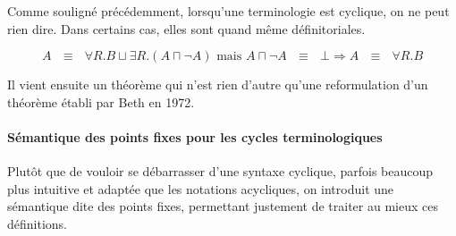 
\par Comme souligné précédemment, lorsqu'une terminologie est cyclique, on ne peut rien dire. Dans certains cas, elles sont quand même définitoriales.

\begin{exemple}
  \begin{displaymath}
    A\mbox{ } \equiv \mbox{ }\forall R.B \sqcup \exists R.(A\sqcap \neg A)
    \mbox{ mais }A \sqcap \neg A \mbox{ } \equiv \mbox{ } \bot \Rightarrow A \mbox{ }\equiv\mbox{ } \forall R.B
  \end{displaymath}
\end{exemple}

\par Il vient ensuite un théorème qui n'est rien d'autre qu'une reformulation d'un théorème établi par Beth en 1972.


\paragraph{Sémantique des points fixes pour les cycles terminologiques}
\label{sec:semant-des-points}

\par Plutôt que de vouloir se débarrasser d'une syntaxe cyclique, parfois beaucoup plus intuitive et adaptée que les notations acycliques, on introduit une sémantique dite des points fixes, permettant justement de traiter au mieux ces définitions.

